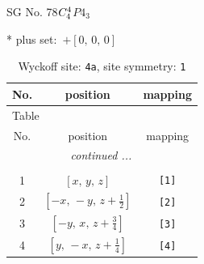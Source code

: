 \documentclass[fleqn,8pt]{jsarticle}
\begin{document}
\setcounter{MaxMatrixCols}{32}

\renewcommand{\tablename}{Table~}
\renewcommand{\figurename}{Figure~}
\begin{center}
\LARGE
SG No. 78\quad$C_{\rm 4}^{4}$\quad$P4_3$\quad[ tetragonal ]
\end{center}
* plus set:\,\,\,$+\left[ 0,\, 0,\, 0 \right]$
\renewcommand{\arraystretch}{1.2}
\begin{longtable}{ccc}
\caption{Wyckoff site: {\tt 4a}, site symmetry: {\tt 1}}
 \\
 \hline \hline
No. & position & mapping \\ \hline \endfirsthead

\multicolumn{2}{l}{\tablename\ \thetable{}} \\
 \hline \hline
No. & position & mapping \\ \hline \endhead

 \hline \hline
\multicolumn{2}{r}{\footnotesize\it continued ...} \\ \endfoot

 \hline \hline
\multicolumn{2}{r}{} \\ \endlastfoot

1 & $\left[ x,\, y,\, z \right]$ & {\tt [1]} \\ \hline
2 & $\left[ - x,\, - y,\, z + \frac{1}{2} \right]$ & {\tt [2]} \\ \hline
3 & $\left[ - y,\, x,\, z + \frac{3}{4} \right]$ & {\tt [3]} \\ \hline
4 & $\left[ y,\, - x,\, z + \frac{1}{4} \right]$ & {\tt [4]} \\
\end{longtable}
\end{document}
